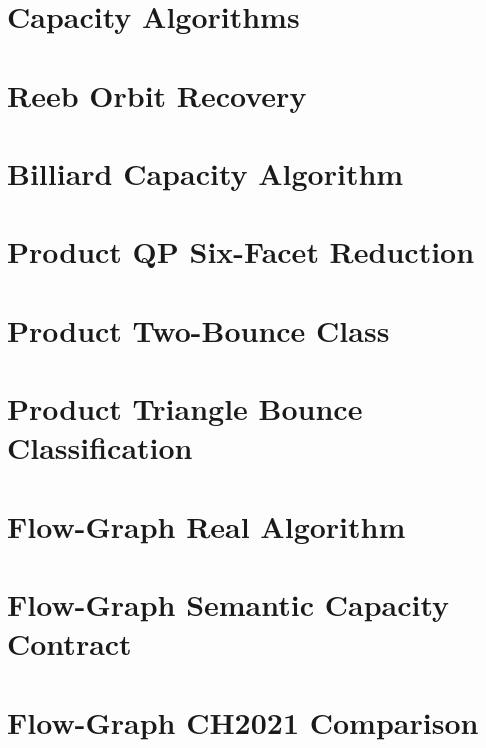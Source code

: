 \documentclass{article}
\begin{document}
\section{Capacity Algorithms}
\label{sec:algorithms}


\section{Reeb Orbit Recovery}


\section{Billiard Capacity Algorithm}


\section{Product QP Six-Facet Reduction}


\section{Product Two-Bounce Class}


\section{Product Triangle Bounce Classification}


\section{Flow-Graph Real Algorithm}


\section{Flow-Graph Semantic Capacity Contract}


\section{Flow-Graph CH2021 Comparison}

\end{document}
